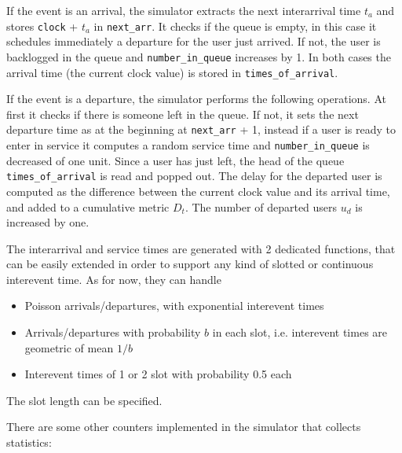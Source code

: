 \documentclass[10pt]{article}
\begin{document}
If the event is an arrival, the simulator extracts the next interarrival time $t_a$ and stores \texttt{clock} + $t_a$ in \texttt{next\_arr}. It checks if the queue is empty, in this case it schedules immediately a departure for the user just arrived. If not, the user is backlogged in the queue and \texttt{number\_in\_queue} increases by 1. In both cases the arrival time (the current clock value) is stored in \texttt{times\_of\_arrival}.

If the event is a departure, the simulator performs the following operations. At first it checks if there is someone left in the queue. If not, it sets the next departure time as at the beginning at \texttt{next\_arr} + 1, instead if a user is ready to enter in service it computes a random service time and \texttt{number\_in\_queue} is decreased of one unit. Since a user has just left, the head of the queue \texttt{times\_of\_arrival} is read and popped out. The delay for the departed user is computed as the difference between the current clock value and its arrival time, and added to a cumulative metric $D_t$. The number of departed users $u_d$ is increased by one. 


The interarrival and service times are generated with 2 dedicated functions, that can be easily extended in order to support any kind of slotted or continuous interevent time. As for now, they can handle 
\begin{itemize}
\item Poisson arrivals/departures, with exponential interevent times 
\item Arrivals/departures with probability $b$ in each slot, i.e. interevent times are geometric of mean $1/b$
\item Interevent times of 1 or 2 slot with probability 0.5 each
\end{itemize}
The slot length can be specified.

There are some other counters implemented in the simulator that collects statistics:
\end{document}
